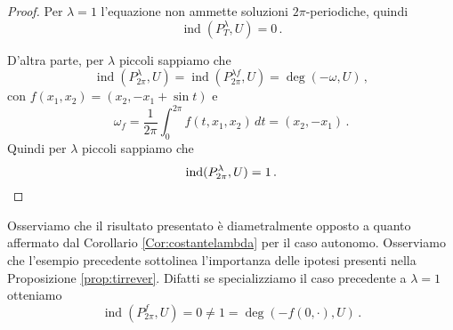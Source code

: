 \documentclass[a4paper, 11pt]{article}
\theoremstyle{definition}
\theoremstyle{plain}
\DeclareMathOperator{\ind}{ind}
\begin{document}
\begin{proof}
	Per $\lambda = 1$ l'equazione non ammette soluzioni $2\pi$-periodiche, quindi
	\[
		\ind(P^\lambda_T, U) = 0\,.
	\]
	
	D'altra parte, per $\lambda$ piccoli sappiamo che
	\[
		\ind(P_{2\pi}^\lambda, U) = \ind(P_{2\pi}^{\lambda f}, U) = \deg(-\omega,U)\,,
	\]
	con $f(x_1, x_2) = (x_2, -x_1 + \sin t)$ e
	\[
		\omega_f = \frac{1}{2\pi}\int_0^{2\pi}f(t,x_1,x_2)\,dt = (x_2, -x_1)\,.
	\]
	Quindi per $\lambda$ piccoli sappiamo che
	\[
		\ind(P_{2\pi}^\lambda,U) = 1\,.\qedhere
	\]
\end{proof}

Osserviamo che il risultato presentato è diametralmente opposto a quanto affermato dal Corollario \ref{Cor:costantelambda} per il caso autonomo. Osserviamo che l'esempio precedente sottolinea l'importanza delle ipotesi presenti nella Proposizione \ref{prop:tirrever}. Difatti se specializziamo il caso precedente a $\lambda = 1$ otteniamo
\[
	\ind(P^f_{2\pi}, U) = 0 \neq 1 = \deg(-f(0,\cdot), U)\,.
\]
\printbibliography
\end{document}
